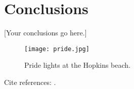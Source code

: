 \chapter*{Conclusions}
\label{ch:conclusion}

[Your conclusions go here.]

\begin{figure}[h]
    \centering
    \texttt{[image: pride.jpg]}
    \caption{Pride lights at the Hopkins beach.}
    \label{fig:jhu_pride}
\end{figure}

Cite references: \cite{example2025, examplebook2024, exampleconf2023, example2024}. 
